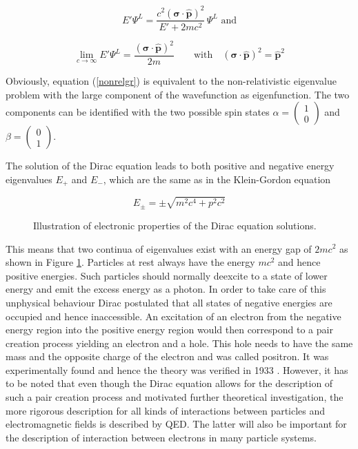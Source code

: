 \begin{equation}
E'\Psi^L = \frac{c^2(\mathbf{\sigma}\cdot\hat{\mathbf{p}})^2}{E'+2mc^2}\,\Psi^L\label{hamneu} \text{ and}
\end{equation}
   
\begin{equation}
\lim_{c\rightarrow\infty} E'\Psi^L = \frac{(\mathbf{\sigma}\cdot\hat{\mathbf{p}})^2}{2m} \qquad\text{with}\quad (\mathbf{\sigma}\cdot\hat{\mathbf{p}})^2=\hat{\mathbf{p}}^2\label{nonrelgr}
\end{equation}

Obviously, equation (\ref{nonrelgr}) is equivalent to the non-relativistic
eigenvalue problem with the large component of the wavefunction as eigenfunction.
The two components can be identified with the two possible spin states
$\alpha = \begin{pmatrix} 1\\0 \end{pmatrix}$ and
$\beta= \begin{pmatrix} 0\\1 \end{pmatrix}$.

The solution of the Dirac equation leads to both positive and negative energy
eigenvalues $E_+$ and $E_-$, which are the same as in the Klein-Gordon equation

\begin{equation}
E_\pm = \pm \sqrt{m^2c^4+p^2c^2}
\end{equation}

\begin{figure}
 \centering
 
 \caption{Illustration of electronic properties of the Dirac equation solutions.}
 \label{figure:dirac_solutions}
\end{figure}

This means that two continua of eigenvalues exist with an energy gap of $2mc^2$
as shown in Figure \ref{figure:dirac_solutions}.
Particles at rest always have the energy $mc^2$ and hence positive energies.
Such particles should normally deexcite to a state of lower energy and emit
the excess energy as a photon. In order to take care of this unphysical behaviour
Dirac postulated that all states of negative energies are occupied and hence
inaccessible. An excitation of an electron from the negative energy region into
the positive energy region would then correspond to a pair creation process yielding
an electron and a hole. This hole needs to have the same mass and the opposite charge
of the electron and was called positron. It was experimentally found and hence the
theory was verified in 1933
\cite{Anderson33}. However, it has to be noted that even though the Dirac equation
allows for the description of such a pair creation process and motivated further
theoretical investigation, the more rigorous
description for all kinds of interactions between particles and electromagnetic
fields is described by \ac{QED}. The latter will also be important for the
description of interaction between electrons in many particle systems.



